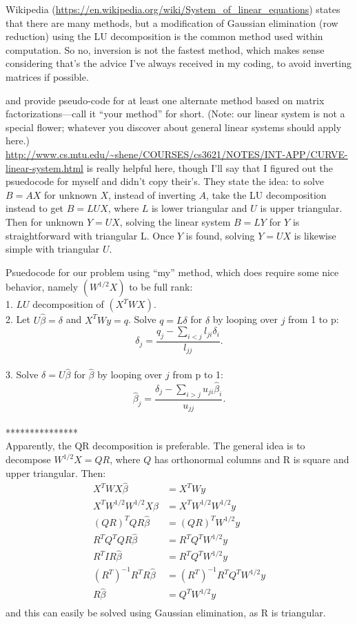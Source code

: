 \documentclass{article}
\begin{document}
\begin{enumerate}[(A)]
\color{blue}
	Wikipedia (\url{https://en.wikipedia.org/wiki/System_of_linear_equations}) states that there are many methods, but a modification of Gaussian elimination (row reduction) using the LU decomposition is the common method used within computation. So no, inversion is not the fastest method, which makes sense considering that's the advice I've always received in my coding, to avoid inverting matrices if possible. 
\color{black}


and provide pseudo-code for at least one alternate method based on matrix factorizations---call it ``your method'' for short.  (Note: our linear system is not a special flower; whatever you discover about general linear systems should apply here.)
\\

\color{blue}
\url{http://www.cs.mtu.edu/~shene/COURSES/cs3621/NOTES/INT-APP/CURVE-linear-system.html} is really helpful here, though I'll say that I figured out the psuedocode for myself and didn't copy their's. They state the idea: to solve $B=AX$ for unknown $X$, instead of inverting $A$, take the LU decomposition instead to get $B=LUX$, where $L$ is lower triangular and $U$ is upper triangular. Then for unknown $Y=UX$, solving the linear system $B=LY$ for $Y$ is straightforward with triangular L. Once $Y$ is found, solving $Y=UX$ is likewise simple with triangular $U$. 

 Psuedocode for our problem using ``my'' method, which does require some nice behavior, namely $ ( W^{1/2} X)$ to be full rank: \\
1. $LU$ decomposition of $(X^TWX)$. 
\\
2. Let $U\hat\beta = \delta$ and $X^TWy = q$. Solve $q = L \delta$ for $\delta$ by looping over $j$ from 1 to p:    $$\delta_j =\frac{q_j - \sum_{i<j} l_{ji}\delta_i}{l_{jj}}.$$
\\
3.  Solve   $\delta = U\hat\beta$ for $\hat\beta$ by looping over $j$ from p to 1: 
$$ \hat\beta_j = \frac{\delta_j - \sum_{i>j}u_{ji}\hat\beta_i }{u_{jj}}.$$
\\
***************
\\
Apparently, the QR decomposition is preferable. The general idea is to decompose $W^{1/2}X= QR$, where $Q$ has orthonormal columns and R is square and upper triangular. Then: 
\begin{align*}
X^T W X \hat \beta & = X^T W y \\
X^T W^{1/2}W^{1/2} X \hat \beta & = X^T W^{1/2}W^{1/2} y \\
(QR)^TQR \hat \beta & = (QR)^T W^{1/2} y \\
R^T Q^T QR \hat \beta & =R^T Q^T W^{1/2} y \\
R^T IR \hat \beta & =R^T Q^T W^{1/2} y \\
(R^T)^{-1}R^T R \hat \beta & =(R^T)^{-1}R^T Q^T W^{1/2} y \\
R \hat \beta & = Q^T W^{1/2} y \\
\end{align*}
and this can easily be solved using Gaussian elimination, as R is triangular. 
\color{black}



\end{enumerate}
\end{document}
